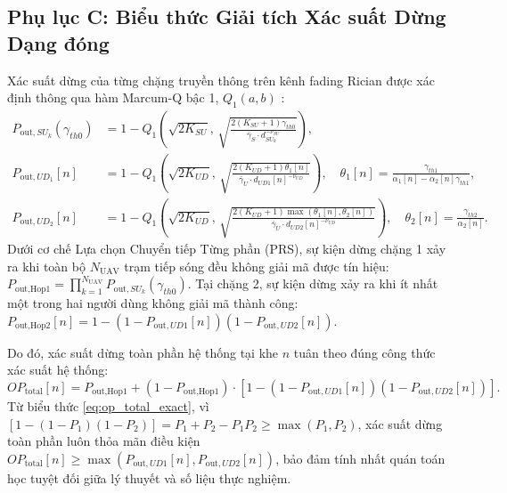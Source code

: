 \subsection*{Phụ lục C: Biểu thức Giải tích Xác suất Dừng Dạng đóng}
Xác suất dừng của từng chặng truyền thông trên kênh fading Rician được xác định thông qua hàm Marcum-Q bậc 1, $Q_1(a, b)$ \cite{alouini2001digital}:
\begin{align}
    P_{\text{out}, SU_k}(\gamma_{th0}) &= 1 - Q_1\left(\sqrt{2 K_{SU}}, \, \sqrt{\frac{2(K_{SU}+1)\gamma_{th0}}{\bar{\gamma}_S \cdot d_{SU_k}^{-\nu_{SU}}}}\right), \label{eq:op_su} \\
    P_{\text{out}, UD_1}[n] &= 1 - Q_1\left(\sqrt{2 K_{UD}}, \, \sqrt{\frac{2(K_{UD}+1)\theta_1[n]}{\bar{\gamma}_U \cdot d_{UD1}[n]^{-\nu_{UD}}}}\right), \quad \theta_1[n] = \frac{\gamma_{th1}}{\alpha_1[n] - \alpha_2[n]\gamma_{th1}}, \label{eq:op_ud1} \\
    P_{\text{out}, UD_2}[n] &= 1 - Q_1\left(\sqrt{2 K_{UD}}, \, \sqrt{\frac{2(K_{UD}+1)\max(\theta_1[n], \theta_2[n])}{\bar{\gamma}_U \cdot d_{UD2}[n]^{-\nu_{UD}}}}\right), \quad \theta_2[n] = \frac{\gamma_{th2}}{\alpha_2[n]}. \label{eq:op_ud2}
\end{align}
Dưới cơ chế Lựa chọn Chuyển tiếp Từng phần (PRS), sự kiện dừng chặng 1 xảy ra khi toàn bộ $N_{\text{UAV}}$ trạm tiếp sóng đều không giải mã được tín hiệu: $P_{\text{out}, \text{Hop1}} = \prod_{k=1}^{N_{\text{UAV}}} P_{\text{out}, SU_k}(\gamma_{th0})$. Tại chặng 2, sự kiện dừng xảy ra khi ít nhất một trong hai người dùng không giải mã thành công: $P_{\text{out}, \text{Hop2}}[n] = 1 - (1 - P_{\text{out}, UD1}[n])(1 - P_{\text{out}, UD2}[n])$.

Do đó, xác suất dừng toàn phần hệ thống tại khe $n$ tuân theo đúng công thức xác suất hệ thống:
\begin{equation}
\label{eq:op_total_exact}
    OP_{\text{total}}[n] = P_{\text{out}, \text{Hop1}} + \left(1 - P_{\text{out}, \text{Hop1}}\right) \cdot \left[1 - (1 - P_{\text{out}, UD1}[n])(1 - P_{\text{out}, UD2}[n])\right].
\end{equation}
Từ biểu thức \eqref{eq:op_total_exact}, vì $[1 - (1 - P_1)(1 - P_2)] = P_1 + P_2 - P_1 P_2 \ge \max(P_1, P_2)$, xác suất dừng toàn phần luôn thỏa mãn điều kiện $OP_{\text{total}}[n] \ge \max(P_{\text{out}, UD1}[n], P_{\text{out}, UD2}[n])$, bảo đảm tính nhất quán toán học tuyệt đối giữa lý thuyết và số liệu thực nghiệm.


